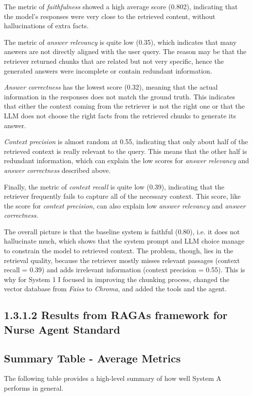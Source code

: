 The metric of \textit{faithfulness} showed a high average score (0.802), indicating that the model’s responses were very close to the retrieved content, without hallucinations of extra facts.

The metric of \textit{answer relevancy} is quite low (0.35), which indicates that many answers are not directly aligned with the user query. The reason may be that the retriever returned chunks that are related but not very specific, hence the generated answers were incomplete or contain redundant information.

\textit{Answer correctness} has the lowest score (0.32), meaning that the actual information in the responses does not match the ground truth. This indicates that either the context coming from the retriever is not the right one or that the LLM does not choose the right facts from the retrieved chunks to generate its answer.

\textit{Context precision} is almost random at 0.55, indicating that only about half of the retrieved context is really relevant to the query. This means that the other half is redundant information, which can explain the low scores for \textit{answer relevancy} and \textit{answer correctness} described above.

Finally, the metric of \textit{context recall} is quite low (0.39), indicating that the retriever frequently fails to capture all of the necessary context. This score, like the score for \textit{context precision},  can also explain low \textit{answer relevancy} and \textit{answer correctness}.

The overall picture is that the baseline system is faithful (0.80), i.e. it does not hallucinate much, which shows that the system prompt and LLM choice manage to constrain the model to retrieved context. The problem, though, lies in the retrieval quality, because the retriever mostly misses relevant passages (context recall = 0.39) and adds irrelevant information (context precision = 0.55). This is why for System 1 I focused in improving the chunking process, changed the vector database from \textit{Faiss} to \textit{Chroma}, and added the tools and the agent.


\subsection*{1.3.1.2 Results from RAGAs framework for Nurse Agent Standard}
\subsection*{Summary Table - Average Metrics}
The following table provides a high-level summary of how well System A performs in general.

